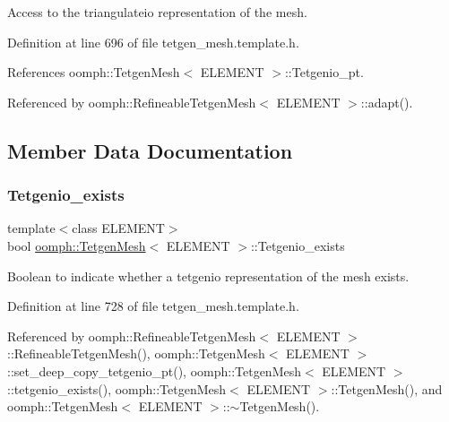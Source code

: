 Access to the triangulateio representation of the mesh. 



Definition at line 696 of file tetgen\+\_\+mesh.\+template.\+h.



References oomph\+::\+Tetgen\+Mesh$<$ E\+L\+E\+M\+E\+N\+T $>$\+::\+Tetgenio\+\_\+pt.



Referenced by oomph\+::\+Refineable\+Tetgen\+Mesh$<$ E\+L\+E\+M\+E\+N\+T $>$\+::adapt().



\subsection{Member Data Documentation}
\mbox{\label{classoomph_1_1TetgenMesh_ab9aa31216620790d084d133b8781be37}} 
\subsubsection{\texorpdfstring{Tetgenio\+\_\+exists}{Tetgenio\_exists}}
{\footnotesize\ttfamily template$<$class E\+L\+E\+M\+E\+NT$>$ \\
bool \hyperlink{classoomph_1_1TetgenMesh}{oomph\+::\+Tetgen\+Mesh}$<$ E\+L\+E\+M\+E\+NT $>$\+::Tetgenio\+\_\+exists\hspace{0.3cm}{\ttfamily [protected]}}



Boolean to indicate whether a tetgenio representation of the mesh exists. 



Definition at line 728 of file tetgen\+\_\+mesh.\+template.\+h.



Referenced by oomph\+::\+Refineable\+Tetgen\+Mesh$<$ E\+L\+E\+M\+E\+N\+T $>$\+::\+Refineable\+Tetgen\+Mesh(), oomph\+::\+Tetgen\+Mesh$<$ E\+L\+E\+M\+E\+N\+T $>$\+::set\+\_\+deep\+\_\+copy\+\_\+tetgenio\+\_\+pt(), oomph\+::\+Tetgen\+Mesh$<$ E\+L\+E\+M\+E\+N\+T $>$\+::tetgenio\+\_\+exists(), oomph\+::\+Tetgen\+Mesh$<$ E\+L\+E\+M\+E\+N\+T $>$\+::\+Tetgen\+Mesh(), and oomph\+::\+Tetgen\+Mesh$<$ E\+L\+E\+M\+E\+N\+T $>$\+::$\sim$\+Tetgen\+Mesh().

\mbox{\label{classoomph_1_1TetgenMesh_a508672e33aa773da58c834a526cb5c59}} 
